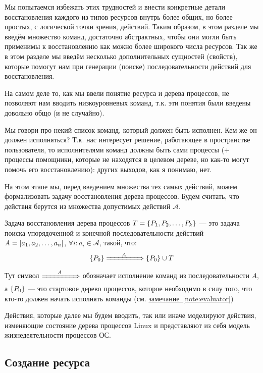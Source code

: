 Мы попытаемся избежать этих трудностей и внести конкретные детали восстановления каждого из типов ресурсов внутрь более общих, но более простых, с логической точки зрения, действий. Таким образом, в этом разделе мы введём множество команд, достаточно абстрактных, чтобы они могли быть применимы к восстановлению как можно более широкого числа ресурсов. Так же в этом разделе мы введём несколько дополнительных сущностей (свойств), которые помогут нам при генерации (поиске) последовательности действий для восстановления.

На самом деле то, как мы ввели понятие ресурса и дерева процессов, не позволяют нам вводить низкоуровневых команд, т.к. эти понятия были введены довольно общо (и не случайно).

\begin{note}
\label{note:evaluator}
Мы говори про некий список команд, который должен быть исполнен. Кем же он должен исполняться? Т.к. нас интересует решение, работающее в пространстве пользователя, то исполнителями команд должны быть сами процессы (+ процессы помощники, которые не находятся в целевом дереве, но как-то могут помочь его восстановлению): других выходов, как я понимаю, нет.
\end{note}

На этом этапе мы, перед введением множества тех самых действий, можем формализовать задачу восстановления дерева процессов. Будем считать, что действия берутся из множества допустимых действий $\mathcal{A}$.
\begin{defn}
Задача восстановления дерева процессов $T = \left\lbrace P_1, P_2, \ldots, P_k \right\rbrace$ --- это задача поиска упорядоченной и конечной последовательности действий $A = \left[ a_1, a_2, \ldots, a_n \right]$, $\forall i: a_i \in \mathcal{A}$, такой, что:
\begin{equation*}
	\left\lbrace P_0 \right\rbrace \xRightarrow{\qquad A\qquad} \left\lbrace P_0 \right\rbrace \cup T
\end{equation*}
Тут символ $\xRightarrow{\qquad A\qquad}$ обозначает исполнение команд из последовательности $A$, а $\left\lbrace P_0 \right\rbrace$ --- это стартовое дерево процессов, которое необходимо в силу того, что кто-то должен начать исполнять команды (см. \hyperref[note:evaluator]{замечание~\ref*{note:evaluator}})
\end{defn}

Действия, которые далее мы будем вводить, так или иначе моделируют действия, изменяющие состояние дерева процессов Linux и представляют из себя модель жизнедеятельности процессов ОС.

\subsection{Создание ресурса}

